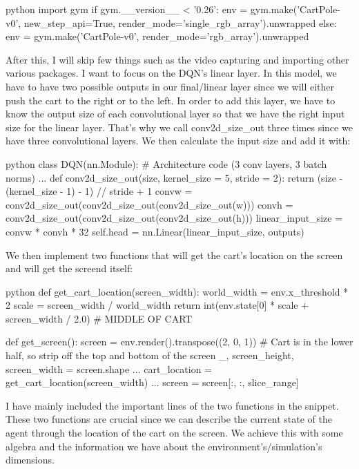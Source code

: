 \documentclass{article}
\numberwithin{equation}{section}
\numberwithin{equation}{section}
\begin{document}
\begin{mintedbox}{python}
import gym
if gym.__version__ < '0.26':
    env = gym.make('CartPole-v0', new_step_api=True, render_mode='single_rgb_array').unwrapped
else:
    env = gym.make('CartPole-v0', render_mode='rgb_array').unwrapped
\end{mintedbox}

After this, I will skip few things such as the video capturing and importing other various packages. I want to focus on the DQN's linear layer. In this model, we have to have two possible outputs in our final/linear layer since we will either push the cart to the right or to the left. In order to add this layer, we have to know the output size of each convolutional layer so that we have the right input size for the linear layer. That's why we call conv2d\_size\_out three times since we have three convolutional layers. We then calculate the input size and add it with: 

\begin{mintedbox}{python}
class DQN(nn.Module):
# Architecture code (3 conv layers, 3 batch norms)
...
        def conv2d_size_out(size, kernel_size = 5, stride = 2):
            return (size - (kernel_size - 1) - 1) // stride  + 1
        convw = conv2d_size_out(conv2d_size_out(conv2d_size_out(w)))
        convh = conv2d_size_out(conv2d_size_out(conv2d_size_out(h)))
        linear_input_size = convw * convh * 32
        self.head = nn.Linear(linear_input_size, outputs)
\end{mintedbox}

We then implement two functions that will get the cart's location on the screen and will get the screend itself:

\begin{mintedbox}{python}
def get_cart_location(screen_width):
world_width = env.x_threshold * 2
    scale = screen_width / world_width
    return int(env.state[0] * scale + screen_width / 2.0)  # MIDDLE OF CART

def get_screen():
screen = env.render().transpose((2, 0, 1))
    # Cart is in the lower half, so strip off the top and bottom of the screen
    _, screen_height, screen_width = screen.shape
...
cart_location = get_cart_location(screen_width)
...
screen = screen[:, :, slice_range]
\end{mintedbox}

I have mainly included the important lines of the two functions in the snippet. These two functions are crucial since we can describe the current state of the agent through the location of the cart on the screen. We achieve this with some algebra and the information we have about the environment's/simulation's dimensions. \\
\end{document}
